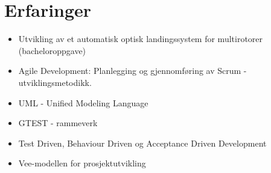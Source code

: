 \documentclass[]{friggeri-cv}
\begin{document}
\section{Erfaringer}
\begin{itemize}
    \item Utvikling av et automatisk optisk landingssystem for multirotorer (bacheloroppgave)
    \item Agile Development: Planlegging og gjennomføring av Scrum - utviklingsmetodikk.
    \item UML - Unified Modeling Language
    \item GTEST - rammeverk
    \item Test Driven, Behaviour Driven og Acceptance Driven Development
    \item Vee-modellen for prosjektutvikling
	
\end{itemize}
\end{document}
